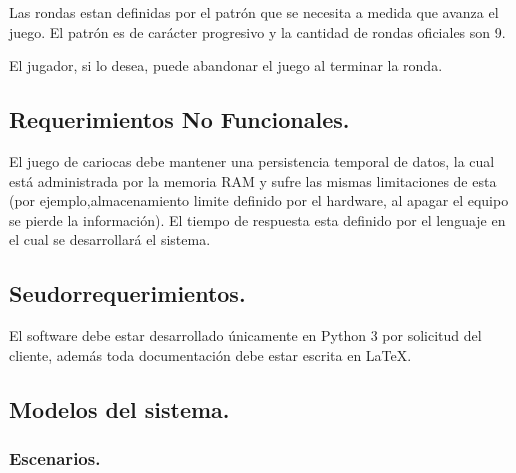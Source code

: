 \documentclass[60pt]{article}
\begin{document}
Las rondas estan definidas por el patrón que se necesita a medida que avanza el juego. El patrón es de carácter progresivo y la cantidad de rondas oficiales son 9.

El jugador, si lo desea, puede abandonar el juego al terminar la ronda.
\subsection{Requerimientos No Funcionales.}\label{cap:requerimientos-no-funcionales}
El juego de cariocas debe mantener una persistencia temporal de datos, la cual está administrada por la memoria RAM y sufre las mismas limitaciones de esta (por ejemplo,almacenamiento limite definido por el hardware, al apagar el equipo se pierde la información).  El tiempo de respuesta esta definido por el lenguaje en el cual se desarrollará el sistema.

\subsection{Seudorrequerimientos.}\label{cap:seudorrequerimientos}
El software debe estar desarrollado únicamente en Python 3 por solicitud del cliente, además toda documentación debe estar escrita en LaTeX.
\subsection{Modelos del sistema.}\label{cap:modelos-sistema}

\subsubsection{Escenarios.}\label{cap:escenarios}
\end{document}
